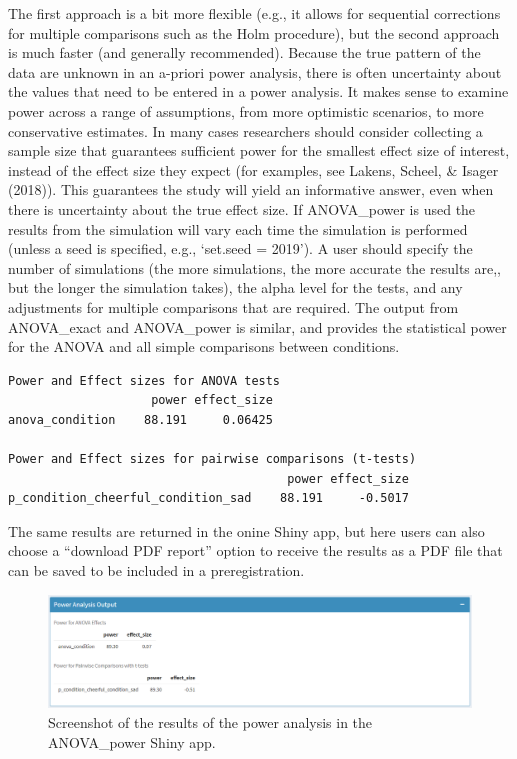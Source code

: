 \documentclass[
  ,man,floatsintext]{apa6}
\begin{document}
The first approach is a bit more flexible (e.g., it allows for sequential corrections for multiple comparisons such as the Holm procedure), but the second approach is much faster (and generally recommended).
Because the true pattern of the data are unknown in an a-priori power analysis, there is often uncertainty about the values that need to be entered in a power analysis.
It makes sense to examine power across a range of assumptions, from more optimistic scenarios, to more conservative estimates.
In many cases researchers should consider collecting a sample size that guarantees sufficient power for the smallest effect size of interest, instead of the effect size they expect (for examples, see Lakens, Scheel, \& Isager (2018)).
This guarantees the study will yield an informative answer, even when there is uncertainty about the true effect size.
If ANOVA\_power is used the results from the simulation will vary each time the simulation is performed (unless a seed is specified, e.g., `set.seed = 2019').
A user should specify the number of simulations (the more simulations, the more accurate the results are,, but the longer the simulation takes), the alpha level for the tests, and any adjustments for multiple comparisons that are required.
The output from ANOVA\_exact and ANOVA\_power is similar, and provides the statistical power for the ANOVA and all simple comparisons between conditions.

\begin{verbatim}
Power and Effect sizes for ANOVA tests
                    power effect_size
anova_condition    88.191     0.06425

Power and Effect sizes for pairwise comparisons (t-tests)
                                       power effect_size
p_condition_cheerful_condition_sad    88.191     -0.5017
\end{verbatim}

The same results are returned in the onine Shiny app, but here users can also choose a \enquote{download PDF report} option to receive the results as a PDF file that can be saved to be included in a preregistration.

\begin{figure}
\centering
\includegraphics{screenshots/anova_power_result.png}
\caption{Screenshot of the results of the power analysis in the ANOVA\_power Shiny app.}
\end{figure}
\end{document}
